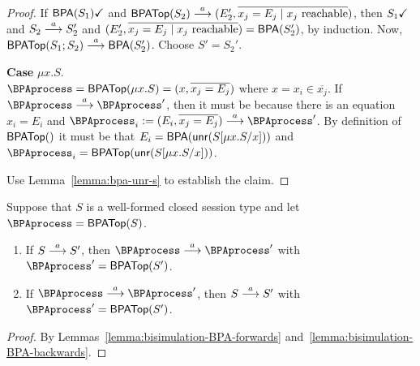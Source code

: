 \begin{proof}
  \begin{sloppypar}
    If $\DONE{\toBPA{S_1}}$ and
    $\toBPATop{S_2} \LTSderives (E_2', \overline{x_j = E_j \mid x_j
      \text{ reachable}})$,
    then $\DONE{S_1}$ and $S_2 \LTSderives S_2'$ and
    $(E_2', \overline{x_j = E_j \mid x_j \text{ reachable}}) =
    \toBPA{S_2'}$,
    by induction. Now, $\toBPATop{S_1;S_2} \LTSderives
    \toBPA{S_2'}$. Choose $S' = S_2'$.
  \end{sloppypar}
  \textbf{Case }$\mu x.S$. \\
  $\BPAprocess = \toBPATop{\mu x.S} = (x, \overline{x_j = E_j})$ where $x=x_i \in \overline{x_j}$.
  If $\BPAprocess \LTSderives \BPAprocess'$,
  then it must be because there is an equation $x_i = E_i$ and $\BPAprocess_i := (E_i, \overline{x_j = E_j})
  \LTSderives \BPAprocess'$.
  By definition of $\toBPATop{}$ it must be that $E_i = \toBPA{\Unravel(S[\mu x. S/x])}$ and
  $\BPAprocess_i = \toBPATop{\Unravel(S[\mu x. S/x])}$.

  Use Lemma~\ref{lemma:bpa-unr-s}
  to establish the claim.
\end{proof}

\begin{theorem}
  Suppose that $S$ is a well-formed closed session type and let
  $\BPAprocess = \toBPATop{S}$.
  \begin{enumerate}
  \item If $ S \LTSderives[a] S'$, then $\BPAprocess \BPAderives[a]
    \BPAprocess'$ with $\BPAprocess' = \toBPATop{S'}$.
  \item If $\BPAprocess \BPAderives[a] \BPAprocess'$, then $S
    \LTSderives[a] S'$ with  $\BPAprocess' = \toBPATop{S'}$.
  \end{enumerate}
\end{theorem}
\begin{proof}
  By Lemmas~\ref{lemma:bisimulation-BPA-forwards} and~\ref{lemma:bisimulation-BPA-backwards}.
\end{proof}

